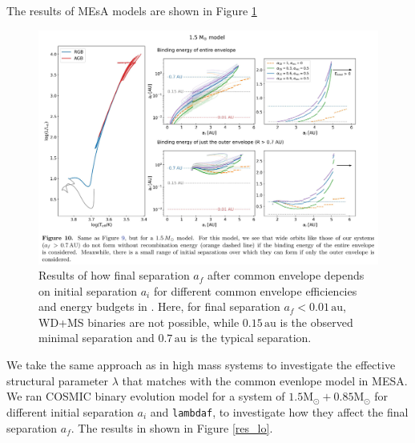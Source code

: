\documentclass[12pt]{article}
\newcommand{\Msun}{\mathrm{M_{\odot}}}
\newcommand{\au}{\, \mathrm{au}}
\begin{document}
The results of MEsA models are shown in Figure \ref{yam_lo}

\begin{figure}
    \centering
    \includegraphics[width=\linewidth]{yamaguchi-1.5+0.8.png}
    \caption{Results of how final separation $a_f$ after common envelope depends on initial separation $a_i$ for different common envelope efficiencies and energy budgets in \cite{yamaguchi_lo}. Here, for final separation $a_f <0.01\au$, WD+MS binaries are not possible, while $0.15\au$ is the observed minimal separation and $0.7\au$ is the typical separation.}
    \label{yam_lo}
\end{figure}

We take the same approach as in high mass systems to investigate the effective structural parameter $\lambda$ that matches with the common evenlope model in MESA. We ran COSMIC binary evolution model for a system of $1.5\Msun + 0.85\Msun$ for different initial separation $a_i$ and \verb|lambdaf|, to investigate how they affect the final separation $a_f$. The results in shown in Figure \ref{res_lo}.
\end{document}

